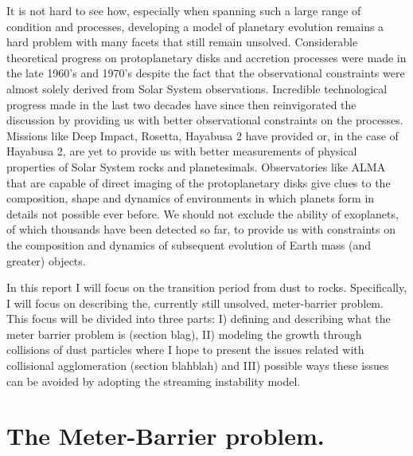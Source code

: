 \documentclass[12pt]{article}
\begin{document}
It is not hard to see how, especially when spanning such a large range of condition and processes, developing a model of planetary evolution remains a hard problem with many facets that still remain unsolved. Considerable theoretical progress on protoplanetary disks and accretion processes were made in the late 1960's and 1970's despite the fact that the observational constraints were almost solely derived from Solar System observations. Incredible technological progress made in the last two decades have since then reinvigorated the discussion by providing us with better observational constraints on the processes. Missions like Deep Impact, Rosetta, Hayabusa 2 have provided or, in the case of Hayabusa 2, are yet to provide us with better measurements of physical properties of Solar System rocks and planetesimals. Observatories like ALMA that are capable of direct imaging of the protoplanetary disks give clues to the composition, shape and dynamics of environments in which planets form in details not possible ever before. We should not exclude the ability of exoplanets, of which thousands have been detected so far, to provide us with constraints on the composition and dynamics of subsequent evolution of Earth mass (and greater) objects. 

In this report I will focus on the transition period from dust to rocks. Specifically, I will focus on describing the, currently still unsolved, meter-barrier problem. This focus will be divided into three parts: I) defining and describing what the meter barrier problem is (section blag), II) modeling the growth through collisions of dust particles where I hope to present the issues related with collisional agglomeration (section blahblah) and III) possible ways these issues can be avoided by adopting the streaming instability model.

\section{The Meter-Barrier problem.}
\end{document}
